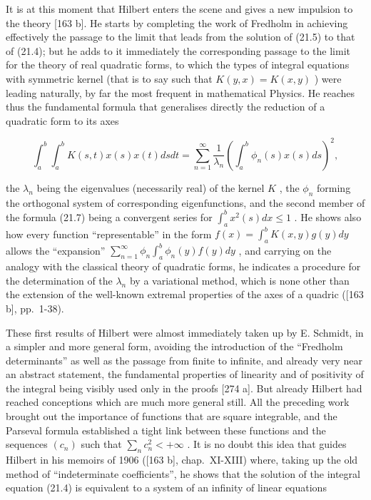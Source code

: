 It is at this moment that Hilbert enters the scene and gives a new impulsion to the theory {[}163 b{]}. He starts by completing the work of Fredholm in achieving effectively the passage to the limit that leads from the solution of (21.5) to that of (21.4); but he adds to it immediately the corresponding passage to the limit for the theory of real quadratic forms, to which the types of integral equations with symmetric kernel (that is to say such that \(K(y, x) = K(x, y)\) ) were leading naturally, by far the most frequent in mathematical Physics. He reaches thus the fundamental formula that generalises directly the reduction of a quadratic form to its axes

\[
\int_ {a} ^ {b} \int_ {a} ^ {b} K (s, t) x (s) x (t) d s d t = \sum_ {n = 1} ^ {\infty} \frac {1}{\lambda_ {n}} \left(\int_ {a} ^ {b} \phi_ {n} (s) x (s) d s\right) ^ {2},\tag{21.7}
\]

the \(\lambda_{n}\) being the eigenvalues (necessarily real) of the kernel \(K\) , the \(\phi_{n}\) forming the orthogonal system of corresponding eigenfunctions, and the second member of the formula (21.7) being a convergent series for \(\int_{a}^{b} x^{2}(s) dx \leq 1\) . He shows also how every function ``representable'' in the form \(f(x) = \int_{a}^{b} K(x, y) g(y) dy\) allows the ``expansion'' \(\sum_{n=1}^{\infty} \phi_{n} \int_{a}^{b} \phi_{n}(y) f(y) dy\) , and carrying on the analogy with the classical theory of quadratic forms, he indicates a procedure for the determination of the \(\lambda_{n}\) by a variational method, which is none other than the extension of the well-known extremal properties of the axes of a quadric ({[}163 b{]}, pp.~1-38).

These first results of Hilbert were almost immediately taken up by E. Schmidt, in a simpler and more general form, avoiding the introduction of the ``Fredholm determinants'' as well as the passage from finite to infinite, and already very near an abstract statement, the fundamental properties of linearity and of positivity of the integral being visibly used only in the proofs {[}274 a{]}. But already Hilbert had reached conceptions which are much more general still. All the preceding work brought out the importance of functions that are square integrable, and the Parseval formula established a tight link between these functions and the sequences \((c_{n})\) such that \(\sum_{n} c_{n}^{2} < +\infty\) . It is no doubt this idea that guides Hilbert in his memoirs of 1906 ({[}163 b{]}, chap.~XI-XIII) where, taking up the old method of ``indeterminate coefficients'', he shows that the solution of the integral equation (21.4) is equivalent to a system of an infinity of linear equations

